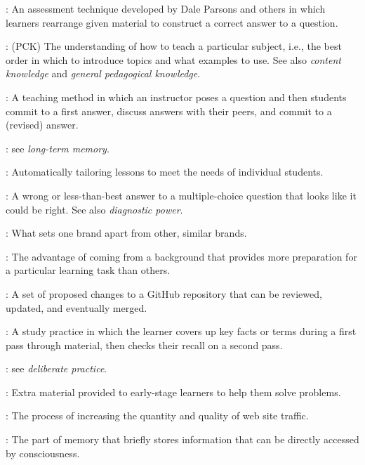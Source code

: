 \begin{description}
: An assessment technique developed by
Dale Parsons and others in which learners rearrange given material to construct
a correct answer to a question.

: (PCK)
The understanding of how to teach a particular subject, i.e., the best order in
which to introduce topics and what examples to use. See also \emph{content
  knowledge} and \emph{general pedagogical knowledge}.

: A teaching method in which an
instructor poses a question and then students commit to a first answer, discuss
answers with their peers, and commit to a (revised) answer.

: see \emph{long-term memory}.

: Automatically tailoring
lessons to meet the needs of individual students.

: A wrong or less-than-best
answer to a multiple-choice question that looks like it could be right. See also
\emph{diagnostic power}.

: What sets one brand apart from other,
similar brands.

: The advantage of coming
from a background that provides more preparation for a particular learning task
than others.

: A set of proposed changes to a GitHub
repository that can be reviewed, updated, and eventually merged.

: A study practice in which
the learner covers up key facts or terms during a first pass through material,
then checks their recall on a second pass.

: see \emph{deliberate
  practice}.

: Extra material provided to early-stage
learners to help them solve problems.

: The process of increasing the
quantity and quality of web site traffic.

: The part of memory that briefly
stores information that can be directly accessed by consciousness.


\end{description}
